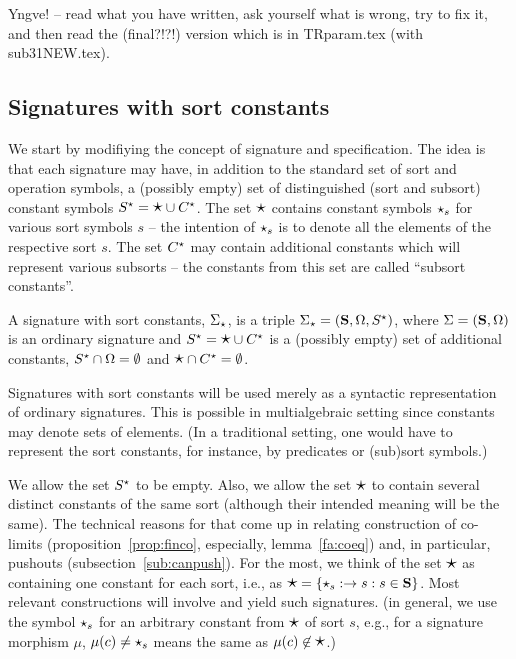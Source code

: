
\setcounter{section}{3}
{\Large{Yngve!}} -- read what you have written, ask yourself what is wrong,
try to fix it, and then read the (final?!?!) version which is in TRparam.tex
(with sub31NEW.tex).

\subsection{Signatures with sort constants}\label{sub:gsp}
We start by modifiying the concept of signature and specification. The idea
is that each signature may have, in addition to the standard set of sort and
operation symbols, a (possibly empty) set of distinguished (sort and subsort) constant
symbols $S^\star = \mbox{\Large{$\star$}}\cup C^\star$. 
The set $\mbox{\Large{$\star$}}$ %
contains  constant symbols
$\star_s$ for various sort symbols $s$ -- the intention of $\star_s$ is to denote all the elements of the respective
sort $s$. 
The set $C^\star$  may contain additional constants
which will represent various subsorts -- the constants from this set are
called ``subsort constants''.
\begin{definition}
\label{def:modsign}
A signature with sort constants, $\Sigma_\star$, is a triple $\Sigma_\star =
 ({\bf S},\Omega,S^\star)$, where $\Sigma=({\bf S},\Omega)$ is an ordinary
 signature and $S^\star=\mbox{\Large{$\star$}}\cup C^\star$ is a (possibly empty) set of additional constants,
 $S^\star\cap\Omega=\emptyset$ and $\mbox{\Large{$\star$}}\cap C^\star=\emptyset$. 
\end{definition}
%
Signatures with sort constants will be used merely as a syntactic representation of 
ordinary signatures. This is possible in multialgebraic setting since
constants may denote sets of elements. (In a traditional setting, one would
have to represent the sort constants, for instance, by predicates or (sub)sort symbols.)

We allow the set $S^\star$ to be empty. Also, we allow the set
$\mbox{\Large{$\star$}}$ to contain several distinct constants of the same sort (although
their intended meaning will be the same).
The technical reasons for that come up in relating construction of co-limits
(proposition~\ref{prop:finco}, especially, lemma~\ref{fa:coeq}) and, in particular, pushouts
(subsection~\ref{sub:canpush}). For the most, we think of the set
$\mbox{\Large{$\star$}}$ as containing one constant for each sort, i.e., as
$\mbox{\Large{$\star$}}=\{\star_s:\to s : s\in{\bf S}\}$. Most relevant constructions will
involve and yield such signatures. (in general, we use the symbol $\star_s$
for an arbitrary constant from $\mbox{\Large{$\star$}}$ of sort $s$, e.g., for a signature
morphism $\mu$, 
$\mu(c)\not=\star_s$ means the same as $\mu(c)\not\in\mbox{\Large{$\star$}}$.)


